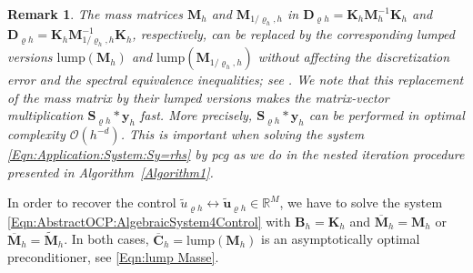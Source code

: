 \documentclass{article}
\newtheorem{remark}{Remark}
\numberwithin{equation}{section}
\begin{document}
\begin{remark}
The mass matrices $\mathbf{M}_h$ and $\mathbf{M}_{1/\varrho_h,h}$ in 
$\mathbf{D}_{\varrho h}= \mathbf{K}_h \mathbf{M}_h^{-1} \mathbf{K}_h$ and
$\mathbf{D}_{\varrho h} = \mathbf{K}_h \mathbf{M}_{1/\varrho_h,h}^{-1}
\mathbf{K}_h$, respectively, can be replaced by the corresponding lumped
versions $\mbox{lump}(\mathbf{M}_h)$ and
$\mbox{lump}(\mathbf{M}_{1/\varrho_h,h})$ without affecting the discretization
error and the spectral equivalence inequalities; see
\cite{LangerLoescherSteinbachYang:2024NLA}. We note that this replacement of
the mass matrix by their lumped versions makes the matrix-vector
multiplication $\mathbf{S}_{\varrho h} * \mathbf{y}_h$ fast. More precisely,
$\mathbf{S}_{\varrho h} * \mathbf{y}_h$ can be performed in optimal complexity
${\mathcal{O}}(h^{-d})$. This is important when solving the
system \eqref{Eqn:Application:System:Sy=rhs} by pcg as we do in the nested
iteration procedure presented in Algorithm~\ref{Algorithm1}.
\end{remark}


In order to  recover the control $\widetilde{u}_{\varrho h} \leftrightarrow
\widetilde{\mathbf u}_{\varrho h} \in \mathbb{R}^M$, we have to solve the
system \eqref{Eqn:AbstractOCP:AlgebraicSystem4Control} with
$\mathbf{B}_h = \mathbf{K}_h$ and $\overline{\mathbf{M}}_h = \mathbf{M}_h$
or $\overline{\mathbf{M}}_h = \widetilde{\mathbf{M}}_h$. In both cases,
$\overline{\mathbf{C}}_h = \mbox{lump}(\mathbf{M}_h)$
is an asymptotically optimal preconditioner, see \eqref{Eqn:lump Masse}.
\end{document}
